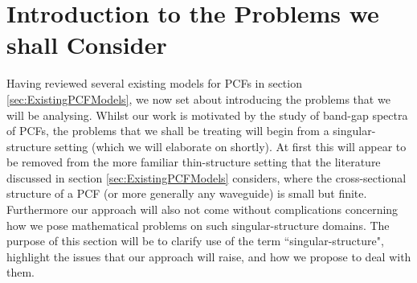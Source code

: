 \section{Introduction to the Problems we shall Consider} \label{sec:OurPhysicalSetup}
Having reviewed several existing models for PCFs in section \ref{sec:ExistingPCFModels}, we now set about introducing the problems that we will be analysing.
Whilst our work is motivated by the study of band-gap spectra of PCFs, the problems that we shall be treating will begin from a singular-structure setting (which we will elaborate on shortly).
At first this will appear to be removed from the more familiar thin-structure setting that the literature discussed in section \ref{sec:ExistingPCFModels} considers, where the cross-sectional structure of a PCF (or more generally any waveguide) is small but finite.
Furthermore our approach will also not come without complications concerning how we pose mathematical problems on such singular-structure domains.
The purpose of this section will be to clarify use of the term ``singular-structure", highlight the issues that our approach will raise, and how we propose to deal with them. \newline

